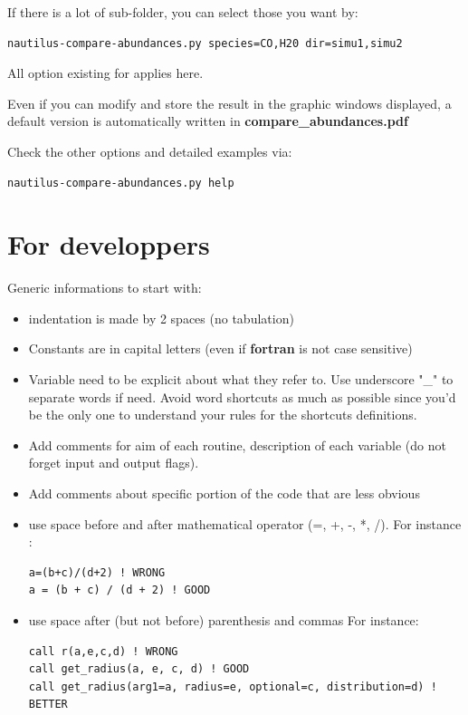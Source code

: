 \documentclass[english,a4paper,twoside]{article}
\begin{document}
If there is a lot of sub-folder, you can select those you want by:
\begin{verbatim}
nautilus-compare-abundances.py species=CO,H20 dir=simu1,simu2
\end{verbatim}

All option existing for  applies here.

Even if you can modify and store the result in the graphic windows displayed, a default version is automatically written in \textbf{compare\_abundances.pdf} 

Check the other options and detailed examples via:
\begin{verbatim}
nautilus-compare-abundances.py help
\end{verbatim}

\section{For developpers}
Generic informations to start with:
\begin{itemize}
\item indentation is made by 2 spaces (no tabulation)
\item Constants are in capital letters (even if \textbf{fortran} is not case sensitive)
\item Variable need to be explicit about what they refer to. Use underscore "\_" to separate words if need. Avoid word shortcuts as much as possible since you'd be the only one to understand your rules for the shortcuts definitions.
\item Add comments for aim of each routine, description of each variable (do not forget input and output flags). 
\item Add comments about specific portion of the code that are less obvious
\item use space before and after mathematical operator (=, +, -, *, /). 
For instance : 
\begin{verbatim}
a=(b+c)/(d+2) ! WRONG
a = (b + c) / (d + 2) ! GOOD
\end{verbatim}
\item use space after (but not before) parenthesis and commas
For instance:
\begin{verbatim}
call r(a,e,c,d) ! WRONG
call get_radius(a, e, c, d) ! GOOD
call get_radius(arg1=a, radius=e, optional=c, distribution=d) ! BETTER
\end{verbatim}
\end{itemize}
\end{document}
